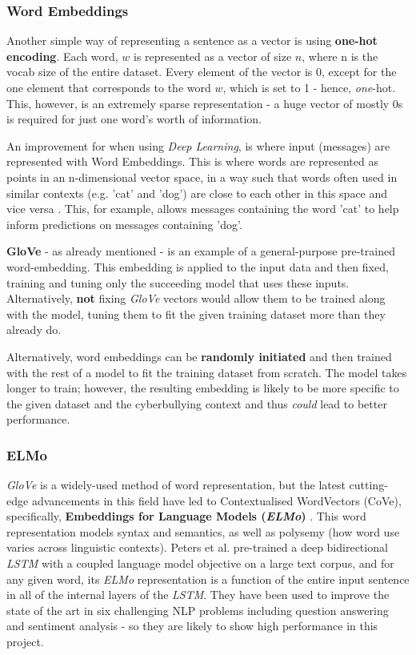 \documentclass[12pt,a4paper]{article}
\begin{document}
\subsubsection{Word Embeddings}
Another simple way of representing a sentence as a vector is using \textbf{one-hot encoding}. Each word, $w$ is represented as a vector of size $n$, where n is the vocab size of the entire dataset. Every element of the vector is 0, except for the one element that corresponds to the word $w$, which is set to 1 - hence, \textit{one}-hot. This, however, is an extremely sparse representation - a huge vector of mostly 0s is required for just one word's worth of information.

An improvement for when using \textit{Deep Learning}, is where input (messages) are represented with Word Embeddings. This is where words are represented as points in an n-dimensional vector space, in a way such that words often used in similar contexts (e.g. 'cat' and 'dog') are close to each other in this space and vice versa \cite[p.464]{DL}. This, for example, allows messages containing the word 'cat' to help inform predictions on messages containing 'dog'.

\textbf{GloVe} \cite{glove} - as already mentioned - is an example of a general-purpose pre-trained word-embedding. This embedding is applied to the input data and then fixed, training and tuning only the succeeding model that uses these inputs. Alternatively, \textbf{not} fixing \textit{GloVe} vectors would allow them to be trained along with the model, tuning them to fit the given training dataset more than they already do.

Alternatively, word embeddings can be \textbf{randomly initiated} and then trained with the rest of a model to fit the training dataset from scratch. The model takes longer to train; however, the resulting embedding is likely to be more specific to the given dataset and the cyberbullying context and thus \textit{could} lead to better performance. 

\subsubsection{ELMo}
\textit{GloVe} is a widely-used method of word representation, but the latest cutting-edge advancements in this field have led to Contextualised WordVectors (CoVe), specifically, \textbf{Embeddings for Language Models (\textit{ELMo})} \cite{Peters}. This word representation models syntax and semantics, as well as polysemy (how word use varies across linguistic contexts). Peters et al. pre-trained a deep bidirectional \textit{LSTM} with a coupled language model objective on a large text corpus, and for any given word, its \textit{ELMo} representation is a function of the entire input sentence in all of the internal layers of the \textit{LSTM}. They have been used to improve the state of the art in six challenging NLP problems including question answering and sentiment analysis - so they are likely to show high performance in this project.
\end{document}
